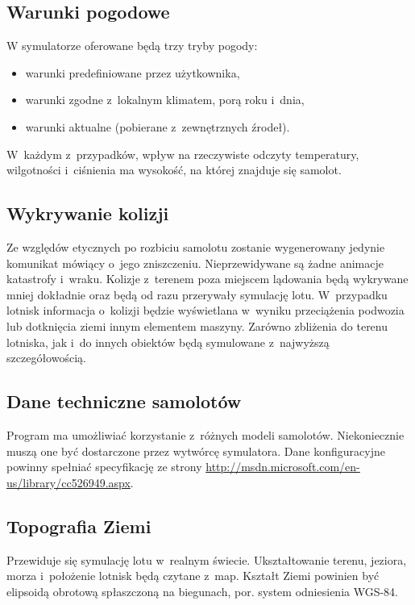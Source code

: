 \documentclass{mwrep}
\begin{document}
\subsection{Warunki pogodowe}
W symulatorze oferowane będą trzy tryby pogody:

\begin{itemize}
\item warunki predefiniowane przez użytkownika,
\item warunki zgodne z~lokalnym klimatem, porą roku i~dnia,
\item warunki aktualne (pobierane z~zewnętrznych źrodeł).
\end{itemize}

W~każdym z~przypadków, wpływ na rzeczywiste odczyty temperatury, wilgotności i~ciśnienia ma wysokość, na której znajduje się samolot.


\subsection{Wykrywanie kolizji}
Ze względów etycznych po rozbiciu samolotu zostanie wygenerowany jedynie komunikat mówiący o~jego zniszczeniu. Nieprzewidywane są żadne animacje katastrofy i~wraku. Kolizje z~terenem poza miejscem lądowania będą wykrywane mniej dokładnie oraz będą od razu przerywały symulację lotu. W~przypadku lotnisk informacja o~kolizji będzie wyświetlana w~wyniku przeciążenia podwozia lub dotknięcia ziemi innym elementem maszyny. Zarówno zbliżenia do terenu lotniska, jak i~do innych obiektów będą symulowane z~najwyższą szczegółowością.

\subsection{Dane techniczne samolotów}
Program ma umożliwiać korzystanie z~różnych modeli samolotów. Niekoniecznie muszą one być dostarczone przez wytwórcę symulatora. Dane konfiguracyjne powinny spełniać specyfikację ze strony \url{http://msdn.microsoft.com/en-us/library/cc526949.aspx}.

\subsection{Topografia Ziemi}
Przewiduje się symulację lotu w~realnym świecie. Ukształtowanie terenu, jeziora, morza i~położenie lotnisk będą czytane z~map. Kształt Ziemi powinien być elipsoidą obrotową spłaszczoną na biegunach, por. system odniesienia WGS-84.
\end{document}
